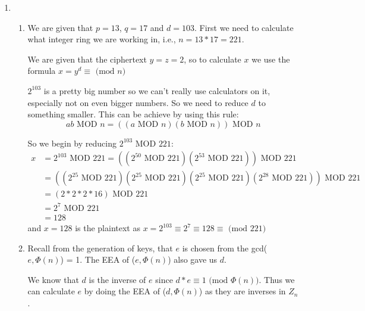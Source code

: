 \documentclass{article}
\begin{document}
\begin{enumerate}
		\item 
		\begin{enumerate}
			\item We are given that $p = 13$, $q = 17$ and $d = 103$. First we need to calculate what integer ring we are working in, i.e., $n = 13* 17 = 221$.
			
			We are given that the ciphertext $y = z = 2$, so to calculate $x$ we use the formula $x = y^d \equiv \text{ (mod } n)$
			
			$2^{103}$ is a pretty big number so we can't really use calculators on it, especially not on even bigger numbers. So we need to reduce $d$ to something smaller. This can be achieve by using this rule:
			$$
			ab \text{ MOD } n = ((a \text{ MOD } n)(b \text{ MOD } n)) \text{ MOD } n
			$$
			
			So we begin by reducing $2^{103} \text{ MOD } 221$:
			\[
			\begin{split}
				x&=2^{103} \text{ MOD } 221 = ((2^{50} \text{ MOD } 221)(2^{53} \text{ MOD } 221)) \text{ MOD } 221\\
				&=((2^{25} \text{ MOD } 221)(2^{25} \text{ MOD } 221)(2^{25} \text{ MOD } 221)(2^{28} \text{ MOD } 221)) \text{ MOD } 221\\
				&=(2*2*2*16) \text{ MOD } 221\\
				&=2^7 \text{ MOD } 221\\
				&=128
			\end{split}
			\]
			and $x = 128$ is the plaintext as $x = 2^{103} \equiv 2^7 \equiv 128 \equiv \text{ (mod } 221)$
			
			\item Recall from the generation of keys, that $e$ is chosen from the gcd($e, \Phi(n)$) = 1. The EEA of ($e, \Phi(n)$) also gave us $d$. 
			
			We know that $d$ is the inverse of $e$ since $d*e \equiv 1 \text{ (mod } \Phi(n))$. Thus we can calculate $e$ by doing the EEA of ($d, \Phi(n)$) as they are inverses in $Z_n$.
			

\end{enumerate}
\end{enumerate}
\end{document}
